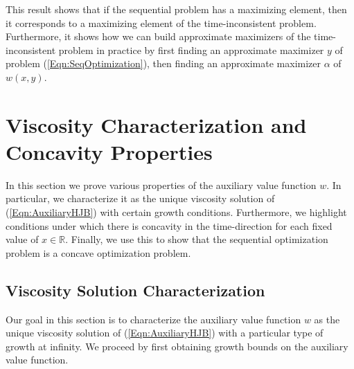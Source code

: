 \documentclass[11pt]{article}
\begin{document}
This result shows that if the sequential problem has a maximizing element, then it corresponds to a maximizing element of the time-inconsistent problem. Furthermore, it shows how we can build approximate maximizers of the time-inconsistent problem in practice by first finding an approximate maximizer $y$ of problem (\ref{Eqn:SeqOptimization}), then finding an approximate maximizer $\alpha$ of $w(x,y)$.

\section{Viscosity Characterization and Concavity Properties}\label{Section:Properties}

In this section we prove various properties of the auxiliary value function $w$. In particular, we characterize it as the unique viscosity solution of (\ref{Eqn:AuxiliaryHJB}) with certain growth conditions. Furthermore, we highlight conditions under which there is concavity in the time-direction for each fixed value of $x\in\mathbb{R}$. Finally, we use this to show that the sequential optimization problem is a concave optimization problem.

\subsection{Viscosity Solution Characterization}\label{Subsection:Viscosity}

Our goal in this section is to characterize the auxiliary value function $w$ as the unique viscosity solution of (\ref{Eqn:AuxiliaryHJB}) with a particular type of growth at infinity. We proceed by first obtaining growth bounds on the auxiliary value function.
\end{document}
